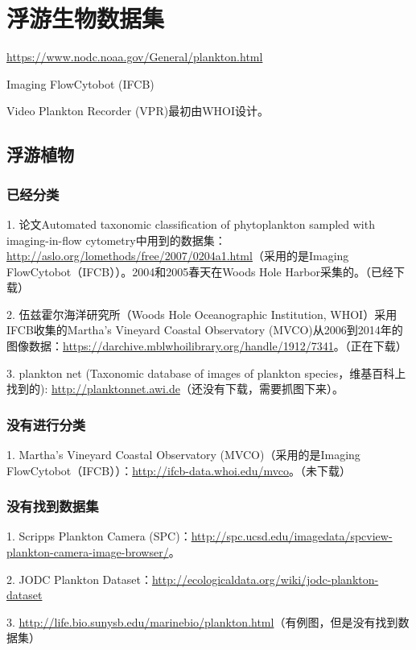 \section{浮游生物数据集}
\url{https://www.nodc.noaa.gov/General/plankton.html}

Imaging FlowCytobot (IFCB)

Video Plankton Recorder (VPR)最初由WHOI设计。


\subsection{浮游植物}

\subsubsection{已经分类}
1. 论文Automated taxonomic classification of phytoplankton sampled with imaging-in-flow cytometry中用到的数据集：\url{http://aslo.org/lomethods/free/2007/0204a1.html}（采用的是Imaging FlowCytobot（IFCB））。2004和2005春天在Woods Hole Harbor采集的。（已经下载）

2. 伍兹霍尔海洋研究所（Woods Hole Oceanographic Institution, WHOI）采用IFCB收集的Martha's Vineyard Coastal Observatory (MVCO)从2006到2014年的图像数据：\url{https://darchive.mblwhoilibrary.org/handle/1912/7341}。（正在下载）

3. plankton net (Taxonomic database of images of plankton species，维基百科上找到的): \url{http://planktonnet.awi.de}（还没有下载，需要抓图下来）。



\subsubsection{没有进行分类}
1. Martha’s Vineyard Coastal Observatory (MVCO)（采用的是Imaging FlowCytobot（IFCB））：\url{http://ifcb-data.whoi.edu/mvco}。（未下载）



\subsubsection{没有找到数据集}
1. Scripps Plankton Camera (SPC)：\url{http://spc.ucsd.edu/imagedata/spcview-plankton-camera-image-browser/}。

2. JODC Plankton Dataset：\url{http://ecologicaldata.org/wiki/jodc-plankton-dataset}

3. \url{http://life.bio.sunysb.edu/marinebio/plankton.html}（有例图，但是没有找到数据集）

